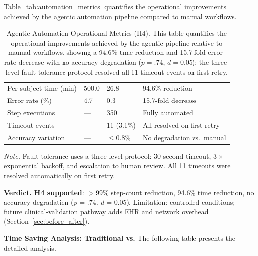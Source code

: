 Table~\ref{tab:automation_metrics} quantifies the operational improvements achieved by the agentic automation pipeline compared to manual workflows.

\begin{table}[!htbp]
\tablestripes\tablefontsize
\caption[Agentic Automation Operational Metrics (H4)]{Agentic Automation Operational Metrics (H4). This table quantifies the operational improvements achieved by the agentic pipeline relative to manual workflows, showing a 94.6\% time reduction and 15.7-fold error-rate decrease with no accuracy degradation ($p = .74$, $d = 0.05$); the three-level fault tolerance protocol resolved all 11 timeout events on first retry.}
\tablefontsize
\begin{tabularx}{\textwidth}{@{} >{\raggedright\arraybackslash}p{3.5cm} L L L @{}}
\toprule
{} &  &  &  \\
\midrule
Per-subject time (min) & 500.0 & 26.8 & 94.6\% reduction \\
Error rate (\%) & 4.7 & 0.3 & 15.7-fold decrease \\
Step executions & --- & 350 & Fully automated \\
Timeout events & --- & 11 (3.1\%) & All resolved on first retry \\
Accuracy variation & --- & $\leq$0.8\% & No degradation vs.\ manual \\
\bottomrule
\end{tabularx}
\vspace{0.5em}\noindent\textit{Note.} Fault tolerance uses a three-level protocol: 30-second timeout, $3\times$ exponential backoff, and escalation to human review. All 11 timeouts were resolved automatically on first retry.
\end{table}

\textbf{Verdict.} \textbf{H4 supported}: $>$99\% step-count reduction, 94.6\% time reduction, no accuracy degradation (\textit{p} = .74, \textit{d} = 0.05). Limitation: controlled conditions; future clinical-validation pathway adds EHR and network overhead (Section~\ref{sec:before_after}).


\noindent\textbf{Time Saving Analysis: Traditional vs.} The following table presents the detailed analysis.

